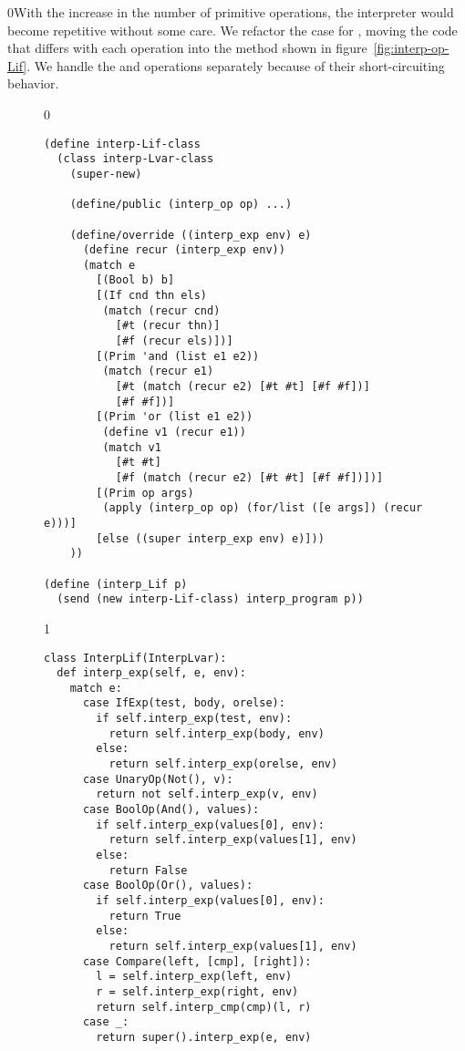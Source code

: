 \documentclass[7x10]{TimesAPriori_MIT}%
\def\racketEd{0}
\def\pythonEd{1}
\def\edition{1}
\newcommand{\racket}[1]{{\if\edition\racketEd{#1}\fi}}
\newcommand{\pythonColor}[0]{}
\numberwithin{theorem}{chapter}
\numberwithin{definition}{chapter}
\numberwithin{equation}{chapter}
\begin{document}
\racket{With the increase in the number of primitive operations, the
  interpreter would become repetitive without some care.  We refactor
  the case for \code{Prim}, moving the code that differs with each
  operation into the \code{interp\_op} method shown in
  figure~\ref{fig:interp-op-Lif}. We handle the \code{and} and
  \code{or} operations separately because of their short-circuiting
  behavior.}

\begin{figure}[tbp]
\begin{tcolorbox}[colback=white]
{\if\edition\racketEd    
\begin{lstlisting}
(define interp-Lif-class
  (class interp-Lvar-class
    (super-new)

    (define/public (interp_op op) ...)

    (define/override ((interp_exp env) e)
      (define recur (interp_exp env))
      (match e
        [(Bool b) b]
        [(If cnd thn els)
         (match (recur cnd)
           [#t (recur thn)]
           [#f (recur els)])]
        [(Prim 'and (list e1 e2))
         (match (recur e1)
           [#t (match (recur e2) [#t #t] [#f #f])]
           [#f #f])]
        [(Prim 'or (list e1 e2))
         (define v1 (recur e1))
         (match v1
           [#t #t]
           [#f (match (recur e2) [#t #t] [#f #f])])]
        [(Prim op args)
         (apply (interp_op op) (for/list ([e args]) (recur e)))]
        [else ((super interp_exp env) e)]))
    ))

(define (interp_Lif p)
  (send (new interp-Lif-class) interp_program p))
\end{lstlisting}
\fi}
{\if\edition\pythonEd\pythonColor
\begin{lstlisting}
class InterpLif(InterpLvar):
  def interp_exp(self, e, env):
    match e:
      case IfExp(test, body, orelse):
        if self.interp_exp(test, env):
          return self.interp_exp(body, env)
        else:
          return self.interp_exp(orelse, env)
      case UnaryOp(Not(), v):
        return not self.interp_exp(v, env)
      case BoolOp(And(), values):
        if self.interp_exp(values[0], env):
          return self.interp_exp(values[1], env)
        else:
          return False
      case BoolOp(Or(), values):
        if self.interp_exp(values[0], env):
          return True
        else:
          return self.interp_exp(values[1], env)
      case Compare(left, [cmp], [right]):
        l = self.interp_exp(left, env)
        r = self.interp_exp(right, env)
        return self.interp_cmp(cmp)(l, r)
      case _:
        return super().interp_exp(e, env)


\end{lstlisting}}
\end{tcolorbox}
\end{figure}
\end{document}
